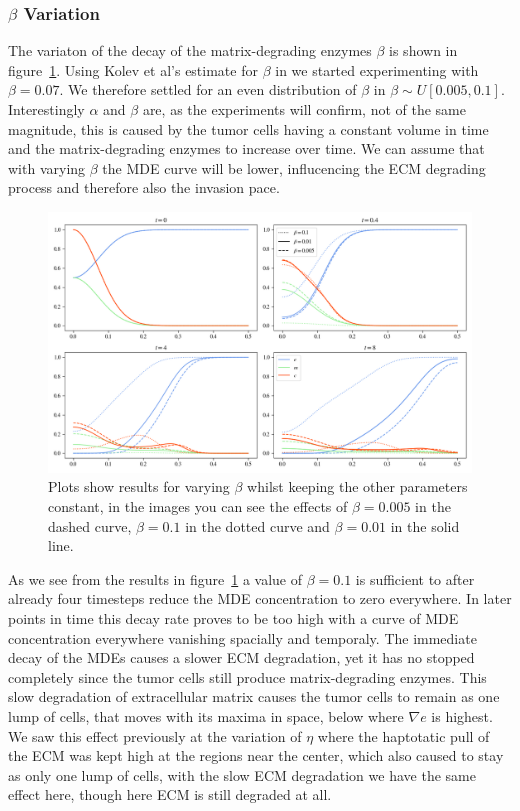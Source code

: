 \subsubsection*{$\beta$ Variation}
The variaton of the decay of the matrix-degrading enzymes $\beta$ is shown in figure~\ref{fig:beta_variation}. Using Kolev et al's estimate for $\beta$ in \cite{Kolev2010} we started experimenting with $\beta=0.07$. We therefore settled for an even distribution of $\beta$ in $\beta \sim U[0.005, 0.1]$. Interestingly $\alpha$ and $\beta$ are, as the experiments will confirm, not of the same magnitude, this is caused by the tumor cells having a constant volume in time and the matrix-degrading enzymes to increase over time. We can assume that with varying $\beta$ the MDE curve will be lower, influcencing the ECM degrading process and therefore also the invasion pace. \newline 
\begin{figure}[h]
    \centering
    \includegraphics[width=\textwidth]{resources/images/beta_variation.png}
    \caption{Plots show results for varying $\beta$ whilst keeping the other parameters constant, in the images you can see the effects of $\beta=0.005$ in the dashed curve, $\beta=0.1$ in the dotted curve and $\beta=0.01$ in the solid line.}
    \label{fig:beta_variation}
\end{figure}
As we see from the results in figure~\ref{fig:beta_variation} a value of $\beta=0.1$ is sufficient to after already four timesteps reduce the MDE concentration to zero everywhere. In later points in time this decay rate proves to be too high with a curve of MDE concentration everywhere vanishing spacially and temporaly. The immediate decay of the MDEs causes a slower ECM degradation, yet it has no stopped completely since the tumor cells still produce matrix-degrading enzymes. This slow degradation of extracellular matrix causes the tumor cells to remain as one lump of cells, that moves with its maxima in space, below where $\nabla e$ is highest. We saw this effect previously at the variation of $\eta$ where the haptotatic pull of the ECM was kept high at the regions near the center, which also caused to stay as only one lump of cells, with the slow ECM degradation we have the same effect here, though here ECM is still degraded at all.\newline
